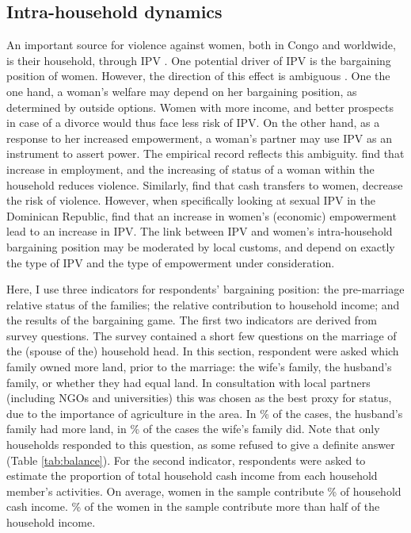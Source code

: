 \documentclass[11pt,a4paper]{scrartcl} %
\begin{document}
\subsection*{Intra-household dynamics}
An important source for violence against women, both in Congo and worldwide, is their household, through IPV \citep{Peterman2011}. One potential driver of IPV is the bargaining position of women. However, the direction of this effect is ambiguous \citep{Eswaran2011}. One the one hand, a woman's welfare may depend on her bargaining position, as determined by outside options. Women with more income, and better prospects in case of a divorce would thus face less risk of IPV. On the other hand, as a response to her increased empowerment, a  woman's partner may use IPV as an instrument to assert power. The empirical record reflects this ambiguity. \cite{Bhattacharya} find that increase in employment, and the increasing of status of a woman within the household reduces violence. Similarly, \cite{Hidrobo2016} find that cash transfers to women, decrease the risk of violence. However, when specifically looking at sexual IPV in the Dominican Republic, \cite{Bueno2017} find that an increase in women's (economic) empowerment lead to an increase in IPV. The link between IPV and women's intra-household bargaining position may be moderated by local customs, and depend on exactly the type of IPV and the type of empowerment under consideration.

Here, I use three indicators for respondents' bargaining position: the pre-marriage relative status of the families; the relative contribution to household income; and the results of the bargaining game. The first two indicators are derived from survey questions. The survey contained a short few questions on the marriage of the (spouse of the) household head. In this section, respondent were asked which family owned more land, prior to the marriage: the wife's family, the husband's family, or whether they had equal land. In consultation with local partners (including NGOs and universities) this was chosen as the best proxy for status, due to the importance of agriculture in the area. In \% of the cases, the husband's family had more land, in \% of the cases the wife's family did. Note that only  households responded to this question, as some refused to give a definite answer (Table \ref{tab:balance}). For the second indicator, respondents were asked to estimate the proportion of total household cash income from each household member's activities. On average, women in the sample contribute \% of household cash income. \% of the women in the sample contribute more than half of the household income.
\end{document}
